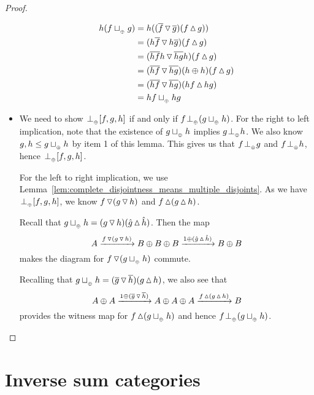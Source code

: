 \begin{proof}
\begin{itemize}
      \begin{align*}
        h (f\tjoin g) &= h ((\rst{f}\tjdown\rst{g})  (f \tjup g))\\
        &= (h\rst{f}\tjdown h\rst{g}) (f \tjup g)\\
        &= (\rst{h f}h\tjdown \rst{h g}h)  (f \tjup g)\\
        &= (\rst{h f}\tjdown \rst{h g})(h\+h)  (f \tjup g)\\
        &= (\rst{h f}\tjdown \rst{h g}) (h f \tjup hg)\\
        &= h f \tjoin h g
      \end{align*}


    \item [\axiom{DJ}{4}] We need to show $\tperp [f,g,h]$ if and only if $f \tperp (g \tjoin h)$.
      For the right to left implication, note that the existence of $g\tjoin h$ implies $g \tperp
      h$. We also know $g, h \le g\tjoin h$ by item 1 of this lemma. This gives us that $f \tperp
      g$ and $f \tperp h$, hence $\tperp [f,g,h]$.

      For the left to right implication, we use
      Lemma~\ref{lem:complete_disjointness_means_multiple_disjoints}. As we have $\tperp [f,g,h]$,
      we  know $f\tjdown(g\tjdown h)$ and $f\tjup(g\tjup h)$.

      Recall that $g\tjoin h = (g\tjdown h)(\rg{g}\tjup\rg{h})$. Then the map
      \[
        A\xrightarrow{f\tjdown(g\tjdown h)} B\+B\+B\xrightarrow{1\+(\rg{g}\tjup\rg{h})} B\+B
      \]
      makes the diagram for $f \tjdown (g\tjoin h)$ commute.

      Recalling that  $g\tjoin h =
      (\rst{g}\tjdown \rst{h})(g\tjup h)$, we also see that
      \[
        A\+A\xrightarrow{1\+(\rst{g}\tjdown\rst{h})}A\+A\+A\xrightarrow{f\tjup(g\tjup h)}B
      \]
      provides the witness map for $f \tjup(g\tjoin h)$ and hence $f \tperp (g \tjoin h)$.
  \end{itemize}

\end{proof}


\section{Inverse sum categories} %
\label{sec:inverse_sum_categories}

